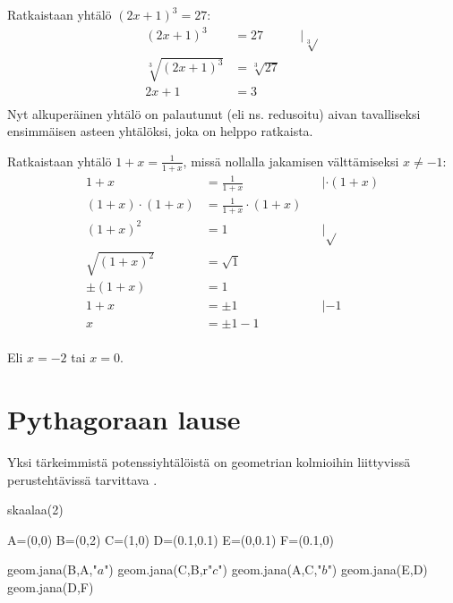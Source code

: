 \begin{esimerkki}
Ratkaistaan yhtälö $(2x+1)^3=27$:
	\begin{align*}
	(2x+1)^3&=27 &&|\sqrt[3]{} \\
	\sqrt[3]{(2x+1)^3}&=\sqrt[3]{27} \\
	2x+1&=3 \\
	\end{align*}
Nyt alkuperäinen yhtälö on palautunut (eli ns. redusoitu) aivan tavalliseksi ensimmäisen asteen yhtälöksi, joka on helppo ratkaista.
\end{esimerkki}

\begin{esimerkki}
Ratkaistaan yhtälö $1+x=\frac{1}{1+x}$, missä nollalla jakamisen välttämiseksi $x\neq-1$:
	\begin{align*}
	1+x&=\frac{1}{1+x} &&| \cdot(1+x) \\
	(1+x)\cdot(1+x)&=\frac{1}{1+x}\cdot(1+x) \\
	(1+x)^2&=1 && |\sqrt{ } \\
	\sqrt{(1+x)^2}&=\sqrt{1} &&\\
	\pm (1+x)&=1&& \\
	1+x &= \pm 1 &&|-1 \\
	x &=\pm 1 -1	 && \\
	\end{align*}

Eli $x=-2$ tai $x=0$.
\end{esimerkki}

\newpage

\section*{Pythagoraan lause}

Yksi tärkeimmistä potenssiyhtälöistä on geometrian kolmioihin liittyvissä perustehtävissä tarvittava .


\begin{center}
\begin{kuva}
	skaalaa(2)

	A=(0,0)
	B=(0,2)
	C=(1,0)
	D=(0.1,0.1)
	E=(0,0.1)
	F=(0.1,0)

	geom.jana(B,A,"$a$")
	geom.jana(C,B,r"$c$")
	geom.jana(A,C,"$b$")
	geom.jana(E,D)
	geom.jana(D,F)
\end{kuva}
\end{center}

